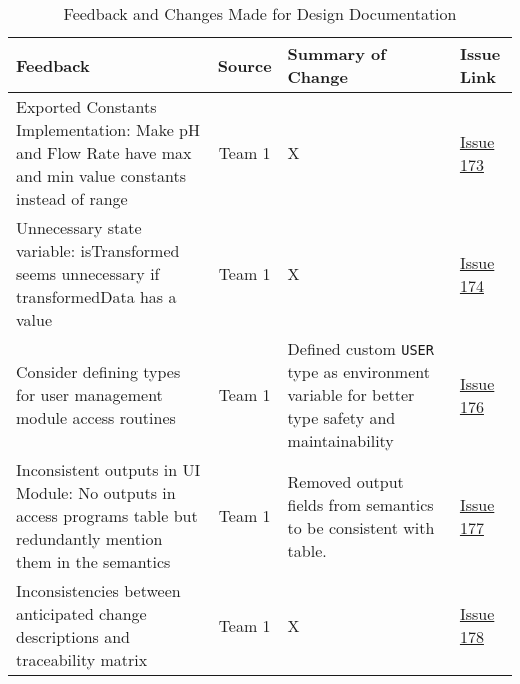 \documentclass{article}
\begin{document}
\begin{table}[H]
\centering
\begin{tabularx}{\textwidth}{|X|c|X|p{1.5cm}|}
    \hline
    \textbf{Feedback} & \textbf{Source} & \textbf{Summary of Change}
    & \textbf{Issue Link} \\
    \hline
    Exported Constants Implementation: Make pH and Flow Rate have max and
    min value constants instead of range & Team 1 & X &
    \href{https://github.com/SumanyaG/Alkalytics/issues/173}{Issue 173} \\
    \hline
    Unnecessary state variable: isTransformed seems unnecessary if
    transformedData has a value & Team 1 & X
    &\href{https://github.com/SumanyaG/Alkalytics/issues/174}{Issue 174} \\
    \hline
    Consider defining types for user management module access routines & Team 1
    & Defined custom \texttt{USER} type as environment variable for better type safety
    and maintainability &
    \href{https://github.com/SumanyaG/Alkalytics/issues/176}{Issue 176} \\
    \hline
    Inconsistent outputs in UI Module: No outputs in access programs table but
    redundantly mention them in the semantics & Team 1 & Removed output fields
    from semantics to be consistent with table. &
    \href{https://github.com/SumanyaG/Alkalytics/issues/177}{Issue 177} \\
    \hline
    Inconsistencies between anticipated change descriptions and traceability
    matrix & Team 1 & X &
    \href{https://github.com/SumanyaG/Alkalytics/issues/178}{Issue 178} \\
    \hline
\end{tabularx}
\caption{Feedback and Changes Made for Design Documentation}
\label{table:Design2}
\end{table}
\end{document}
